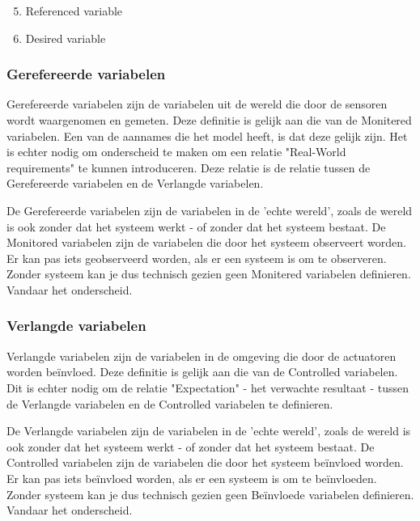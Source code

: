 \documentclass{article}
\begin{document}
		\begin{enumerate}
			\setcounter{enumi}{4}
			\item Referenced variable
			\item Desired variable
		\end{enumerate}

			\subsubsection{Gerefereerde variabelen}
			
			Gerefereerde variabelen zijn de variabelen uit de wereld die door de sensoren wordt waargenomen en gemeten. Deze definitie is gelijk aan die van de Monitered variabelen. Een van de aannames die het model heeft, is dat deze gelijk zijn. Het is echter nodig om onderscheid te maken om een relatie "Real-World requirements" te kunnen introduceren. Deze relatie is de relatie tussen de Gerefereerde variabelen en de Verlangde variabelen. \par

			De Gerefereerde variabelen zijn de variabelen in de 'echte wereld', zoals de wereld is ook zonder dat het systeem werkt - of zonder dat het systeem bestaat. De Monitored variabelen zijn de variabelen die door het systeem observeert worden. Er kan pas iets geobserveerd worden, als er een systeem is om te observeren. Zonder systeem kan je dus technisch gezien geen Monitered variabelen definieren. Vandaar het onderscheid. \par
			
			\subsubsection{Verlangde variabelen}
			
			Verlangde variabelen zijn de variabelen in de omgeving die door de actuatoren worden beïnvloed. Deze definitie is gelijk aan die van de Controlled variabelen. Dit is echter nodig om de relatie "Expectation" - het verwachte resultaat - tussen de Verlangde variabelen en de Controlled variabelen te definieren. \par

			De Verlangde variabelen zijn de variabelen in de 'echte wereld', zoals de wereld is ook zonder dat het systeem werkt - of zonder dat het systeem bestaat. De Controlled variabelen zijn de variabelen die door het systeem beïnvloed worden. Er kan pas iets beïnvloed worden, als er een systeem is om te beïnvloeden. Zonder systeem kan je dus technisch gezien geen Beïnvloede variabelen definieren. Vandaar het onderscheid. \cite{icsoft-pt16} \par
		
\end{document}
